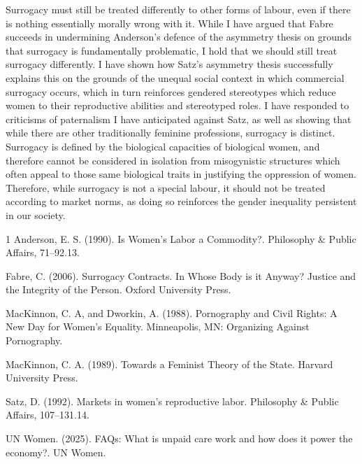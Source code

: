 Surrogacy
must still be treated differently to other forms of labour, even if
there is nothing essentially morally wrong with it. While I have argued
that Fabre succeeds in undermining Anderson's defence of the asymmetry
thesis on grounds that surrogacy is fundamentally problematic, I hold
that we should still treat surrogacy differently. I have shown how
Satz's asymmetry thesis successfully explains this on the grounds of the
unequal social context in which commercial surrogacy occurs, which in
turn reinforces gendered stereotypes which reduce women to their
reproductive abilities and stereotyped roles. I have responded to
criticisms of paternalism I have anticipated against Satz, as well as
showing that while there are other traditionally feminine professions,
surrogacy is distinct. Surrogacy is defined by the biological capacities
of biological women, and therefore cannot be considered in isolation
from misogynistic structures which often appeal to those same biological
traits in justifying the oppression of women. Therefore, while surrogacy
is not a special labour, it should not be treated according to market
norms, as doing so reinforces the gender inequality persistent in our
society. 


\begin{hangparas}{\hangingindent}{1}
    Anderson, E. S. (1990). Is Women's Labor a Commodity?. Philosophy \& Public Affairs, 71--92.13. 

    Fabre, C. (2006). Surrogacy
Contracts. In Whose Body is it Anyway? Justice and the Integrity of the
Person. Oxford University Press. 

    MacKinnon, C. A, and Dworkin, A.
(1988). Pornography and Civil Rights: A New Day for Women's Equality.
Minneapolis, MN: Organizing Against Pornography. 

    MacKinnon, C. A.
(1989). Towards a Feminist Theory of the State. Harvard University
Press. 

Satz, D. (1992). Markets in women's reproductive labor.
Philosophy \& Public Affairs, 107--131.14. 

    UN Women. (2025). FAQs: What
is unpaid care work and how does it power the economy?. UN Women.
\end{hangparas}